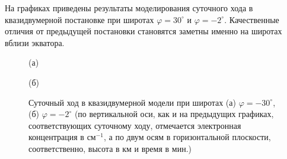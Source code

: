 \documentclass[14pt, a4paper, fleqn]{extarticle}
\begin{document}
На графиках приведены результаты моделирования суточного хода в квазидвумерной постановке при широтах $\varphi = 30^\circ$ и $\varphi = -2^\circ$. Качественные отличия от предыдущей постановки становятся заметны именно на широтах вблизи экватора. 


\begin{figure}[H]

(а)
\end{figure}

\begin{figure}[H]

(б)
\caption{Суточный ход в квазидвумерной модели при широтах (а) $\varphi = -30^\circ$, (б) $\varphi = -2^\circ$ (по вертикальной оси, как и на предыдущих графиках, соответствующих суточному ходу, отмечается электронная концентрация в см$^{-1}$, а по двум осям в горизонтальной плоскости, соответственно, высота в км и время в мин.)}
\end{figure}
\end{document}
